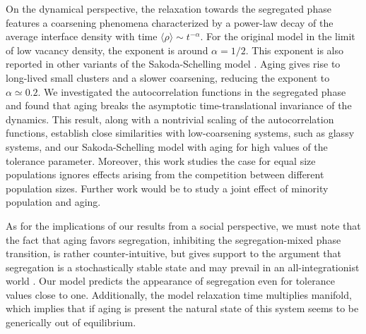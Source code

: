 On the dynamical perspective, the relaxation towards the segregated phase features a coarsening phenomena characterized by a power-law decay of the average interface density with time $\langle \rho \rangle \sim t^{-\alpha}$. For the original model in the limit of low vacancy density, the exponent is around $\alpha = 1/2$. This exponent is also reported in other variants of the Sakoda-Schelling model \cite{Dall_Asta_2008,Interfacial_roughening}. Aging gives rise to long-lived small clusters and a slower coarsening, reducing the exponent to $\alpha \simeq 0.2$. We investigated the autocorrelation functions in the segregated phase and found that aging breaks the asymptotic time-translational invariance of the dynamics. This result, along with a nontrivial scaling of the autocorrelation functions, establish close similarities with low-coarsening systems, such as glassy systems, and our Sakoda-Schelling model with aging for high values of the tolerance parameter. Moreover, this work studies the case for equal size populations ignores effects arising from the competition between different population sizes. Further work would be to study a joint effect of minority population and aging.

As for the implications of our results from a social perspective, we must note that the fact that aging favors segregation, inhibiting the segregation-mixed phase transition, is rather counter-intuitive, but gives support to the argument that segregation is a stochastically stable state and may prevail in an all-integrationist world \cite{Zhang}. Our model predicts the appearance of segregation even for tolerance  values close to one. Additionally, the model relaxation time multiplies manifold, which implies that if aging is present the natural state of this system seems to be generically out of equilibrium.   